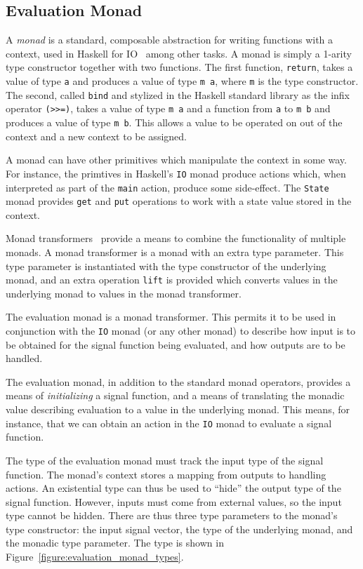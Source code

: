 \subsection{Evaluation Monad}
\label{section:System_Design_and_Interface-Types-Evaluation_Monad}

A {\em monad} is a standard, composable abstraction for writing functions with
a context, used in Haskell for IO~\cite{PeytonJones1993,PeytonJones2001} among
other tasks. A monad is simply a 1-arity type constructor together with two
functions. The first function, {\tt return}, takes a value of type {\tt a} and
produces a value of type {\tt m a}, where {\tt m} is the type constructor. The
second, called {\tt bind} and stylized in the Haskell standard library as the
infix operator {\tt (>>=)}, takes a value of type {\tt m a} and a function
from {\tt a} to {\tt m b} and produces a value of type {\tt m b}. This allows
a value to be operated on out of the context and a new context to be assigned.

A monad can have other primitives which manipulate the context in some way. For 
instance, the primtives in Haskell's {\tt IO} monad produce actions which, when
interpreted as part of the {\tt main} action, produce some side-effect. The
{\tt State} monad provides {\tt get} and {\tt put} operations to work with a 
state value stored in the context.

Monad transformers~\cite{Jones1995} provide a means to combine the functionality
of multiple monads. A monad transformer is a monad with an extra type parameter.
This type parameter is instantiated with the type constructor of the underlying
monad, and an extra operation {\tt lift} is provided which converts values in
the underlying monad to values in the monad transformer.

The evaluation monad is a monad transformer. This permits it to be used in
conjunction with the {\tt IO} monad (or any other monad) to describe how input
is to be obtained for the signal function being evaluated, and how outputs are
to be handled.

The evaluation monad, in addition to the standard monad operators, provides a
means of {\em initializing} a signal function, and a means of translating the
monadic value describing evaluation to a value in the underlying monad. This
means, for instance, that we can obtain an action in the {\tt IO} monad to
evaluate a signal function.

The type of the evaluation monad must track the input type of the signal
function. The monad's context stores a mapping from outputs to handling actions.
An existential type can thus be used to ``hide'' the output type of the signal
function. However, inputs must come from external values, so the input type
cannot be hidden. There are thus three type parameters to the monad's type
constructor: the input signal vector, the type of the underlying monad, and the
monadic type parameter. The type is shown in Figure~\ref{figure:evaluation_monad_types}.

